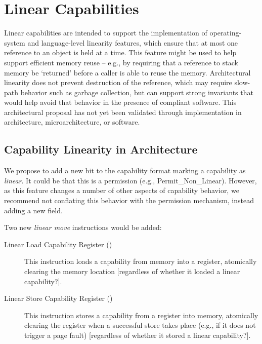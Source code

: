 \section{Linear Capabilities} %
\label{section:linear-capabilities}

Linear capabilities are intended to support the implementation of
operating-system and language-level linearity features, which ensure that at
most one reference to an object is held at a time.
This feature might be used to help support efficient memory reuse -- e.g., by
requiring that a reference to stack memory be `returned' before a caller is
able to reuse the memory.
Architectural linearity does not prevent destruction of the reference, which
may require slow-path behavior such as garbage collection, but can support
strong invariants that would help avoid that behavior in the presence of
compliant software.
This architectural proposal has not yet been validated through
implementation in architecture, microarchitecture, or software.

\subsection{Capability Linearity in Architecture}

We propose to add a new bit to the capability format marking a capability as
\textit{linear}.
%
%
It could be that this is a permission (e.g., Permit\_Non\_Linear).
However, as this
feature changes a number of other aspects of capability behavior, we recommend
not conflating this behavior with the permission mechanism, instead adding a
new field.

Two new \textit{linear move} instructions would be added:

\begin{description}
\item[Linear Load Capability Register ()]
This instruction loads a capability from memory into a register, atomically
clearing the memory location [regardless of whether it loaded a linear
capability?].

\item[Linear Store Capability Register ()]
This instruction stores a capability from a register into memory, atomically
clearing the register when a successful store takes place (e.g., if it does
not trigger a page fault) [regardless of whether it stored a linear
capability?].
\end{description}

